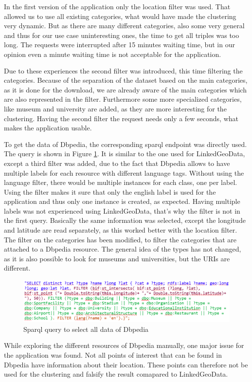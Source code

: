 In the first version of the application only the location filter was used. That allowed us to use all existing categories, what would have made the clustering very dynamic. But as there are many different categories, also some very general and thus for our use case uninteresting ones, the time to get all triples was too long. The requests were interrupted after 15 minutes waiting time, but in our opinion even a minute waiting time is not acceptable for the application. 

Due to these experiences the second filter was introduced, this time filtering the categories. Because of the separation of the dataset based on the main categories, as it is done for the download, we are already aware of the main categories which are also represented in the filter. Furthermore some more specialized categories, like museum and university are added, as they are more interesting for the clustering. Having the second filter the request needs only a few seconds, what makes the application usable.

To get the data of Dbpedia, the corresponding sparql endpoint was directly used. The query is shown in Figure \ref{fig:sparqlDbpedia}. It is similar to the one used for LinkedGeoData, except a third filter was added, due to the fact that Dbpedia allows to have multiple labels for each resource with different language tags. Without using the language filter, there would be multiple instances for each class, one per label. Using the filter makes it sure that only the english label is used for the application and thus only one instance is created, as expected. Having multiple labels was not experienced using LinkedGeoData, that’s why the filter is not in the first query. Basically the same information was selected, except the longitude and latitude are read separately, as this worked better with the location filter. The filter on the categories has been modified, to filter the categories that are attached to a Dbpedia resource. The general idea of the types has not changed, as it is also possible to look for museums and universities, but the URIs are different. 

\begin{figure}
	\centering
	\includegraphics[scale=0.7]{./content/sparqlDbpedia.png}
	\caption{Sparql query to select all data of Dbpedia}\label{fig:sparqlDbpedia}
\end{figure}

While exploring the different resources of Dbpedia manually, one major issue for the application was found. Not all points of interest that can be found in Dbpedia have information about their location. These points can therefore not be used for the clustering and falsify the result comapared to LinkedGeoData.